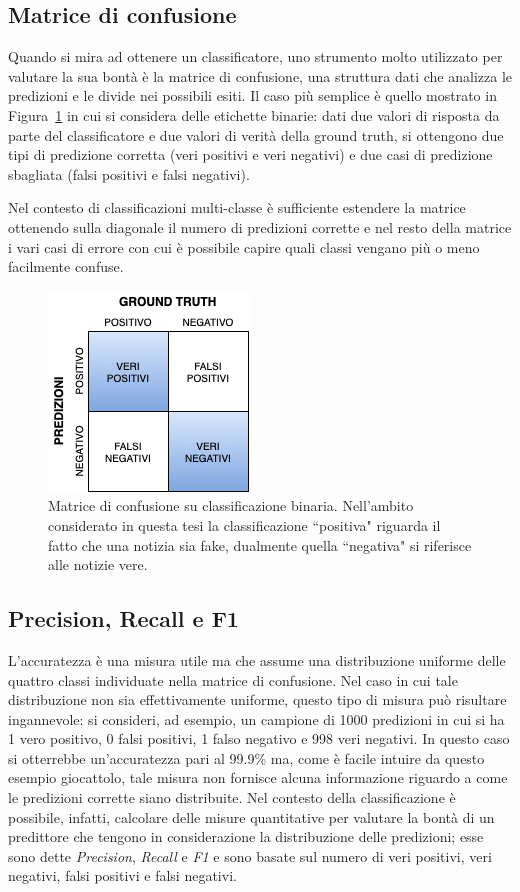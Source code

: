 \documentclass[12pt]{report}
\theoremstyle{definition}
\begin{document}
\subsection{Matrice di confusione}
Quando si mira ad ottenere un classificatore, uno strumento molto utilizzato per valutare la sua bontà è la matrice di confusione, una struttura dati che analizza le predizioni e le divide nei possibili esiti. 
Il caso più semplice è quello mostrato in Figura~\ref{confusion} in cui si considera delle etichette binarie: dati due valori di risposta da parte del classificatore e due valori di verità della ground truth, si ottengono due tipi di predizione corretta (veri positivi e veri negativi) e due casi di predizione sbagliata (falsi positivi e falsi negativi).

Nel contesto di classificazioni multi-classe è sufficiente estendere la matrice ottenendo sulla diagonale il numero di predizioni corrette e nel resto della matrice i vari casi di errore con cui è possibile capire quali classi vengano più o meno facilmente confuse. 

\begin{figure}
    \centering
    \includegraphics[scale=0.7]{images/confusion_matrix.png}
    \caption{Matrice di confusione su classificazione binaria. Nell'ambito considerato in questa tesi la classificazione ``positiva" riguarda il fatto che una notizia sia fake, dualmente quella ``negativa" si riferisce alle notizie vere.}
    \label{confusion}
\end{figure}

\subsection{Precision, Recall e F1}\label{erroreclass}
L'accuratezza è una misura utile ma che assume una distribuzione uniforme delle quattro classi individuate nella matrice di confusione. Nel caso in cui tale distribuzione non sia effettivamente uniforme, questo tipo di misura può risultare ingannevole: si consideri, ad esempio, un campione di 1000 predizioni in cui si ha 1 vero positivo, 0 falsi positivi, 1 falso negativo e 998 veri negativi. In questo caso si otterrebbe un'accuratezza pari al 99.9\% ma, come è facile intuire da questo esempio giocattolo, tale misura non fornisce alcuna informazione riguardo a come le predizioni corrette siano distribuite.
Nel contesto della classificazione è possibile, infatti, calcolare delle misure quantitative per valutare la bontà di un predittore che tengono in considerazione la distribuzione delle predizioni; esse sono dette \textit{Precision}, \textit{Recall} e \textit{F1} e sono basate sul numero di veri positivi, veri negativi, falsi positivi e falsi negativi.
\end{document}
